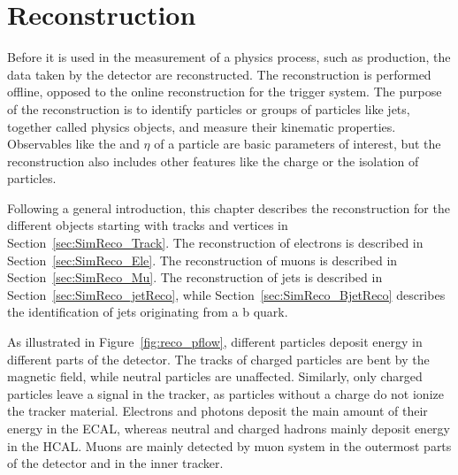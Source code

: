 
\chapter{Reconstruction}
\label{sec:SimReco_Reco}

Before it is used in the measurement of a physics process, such as \ttbar production, the data taken by the detector are reconstructed.
The reconstruction is performed offline, opposed to the online reconstruction for the trigger system.
The purpose of the reconstruction is to identify particles or groups of particles like jets, together called physics objects, and measure their kinematic properties.
Observables like the \pt and $\eta$ of a particle are basic parameters of interest, but the reconstruction also includes other features like the charge or the isolation of particles.

Following a general introduction, this chapter describes the reconstruction for the different objects starting with tracks and vertices in Section~\ref{sec:SimReco_Track}.
The reconstruction of electrons is described in Section~\ref{sec:SimReco_Ele}.
The reconstruction of muons is described in Section~\ref{sec:SimReco_Mu}.
The reconstruction of jets is described in Section~\ref{sec:SimReco_jetReco}, while Section~\ref{sec:SimReco_BjetReco} describes the identification of jets originating from a b quark.

As illustrated in Figure~\ref{fig:reco_pflow}, different particles deposit energy in different parts of the detector.
The tracks of charged particles are bent by the magnetic field, while neutral particles are unaffected.
Similarly, only charged particles leave a signal in the tracker, as particles without a charge do not ionize the tracker material.
Electrons and photons deposit the main amount of their energy in the ECAL, whereas neutral and charged hadrons mainly deposit energy in the HCAL.
Muons are mainly detected by muon system in the outermost parts of the detector and in the inner tracker.

